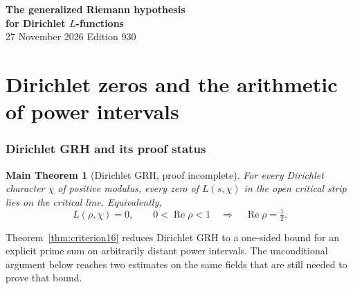 \documentclass[a4paper,11pt]{article}
\newtheorem{maintheorem}[proposition]{Main Theorem}
\theoremstyle{definition}
\theoremstyle{remark}
\newcommand{\real}{\operatorname{Re}}\newcommand{\imag}{\operatorname{Im}}
\numberwithin{equation}{section}
\begin{document}
\setcounter{part}{0}
\thispagestyle{plain}\begin{center}
{\LARGE\bfseries The generalized Riemann hypothesis\\[2pt]for Dirichlet \(L\)-functions}\\[6pt]
{\small 27 November 2026 \quad\textperiodcentered\quad Edition 930}\end{center}
\part{Dirichlet zeros and the arithmetic of power intervals}\label{part:I}
\begin{abstract}\noindent The zero criterion in this volume uses a prime sum on power intervals. We obtain its explicit formula, choose the two quadratic twists and specify the two arithmetic estimates on common number fields. We construct rational flag coordinates with integral unmarked root ratios and prescribed auxiliary characters. All their unmarked divisors can be placed above the cohomological cutoff at completely split primes. The exact quadratic-sign decomposition of the centered count at the selected word weights compares its signal part with the signed definite Gram determinant. On the polynomial-conductor intervals an explicit positive contribution from the ramified prime must be retained in the centered identity. Its size and the surviving cohomology orbits are given on the same field. On the common period fields, a single set of weights of density tending to zero contains the support of the truncated local groups at all odd primes up to the cutoff. The estimate holds uniformly for every weight limit on the interval.\end{abstract}
\setcounter{section}{0}

\section{Dirichlet GRH and its proof status}\label{nav:I-00}\label{nav:volume-I}
\label{sec:statement}\label{sec:finish}\label{sec:sum}
\begin{maintheorem}[Dirichlet GRH, proof incomplete]\label{thm:grh16}
For every Dirichlet character \(\chi\) of positive modulus, every zero of \(L(s,\chi)\) in the open critical strip lies on the critical line. Equivalently,
\begin{equation*}
 L(\rho,\chi)=0,\qquad 0<\real\rho<1
                    \quad\Longrightarrow\quad \real\rho=\tfrac12. \tag{G}\label{eq:G}
\end{equation*}
\end{maintheorem}
Theorem~\ref{thm:criterion16} reduces Dirichlet GRH to a one-sided bound for an explicit prime sum on arbitrarily distant power intervals. The unconditional argument below reaches two estimates on the same fields that are still needed to prove that bound.
\end{document}
